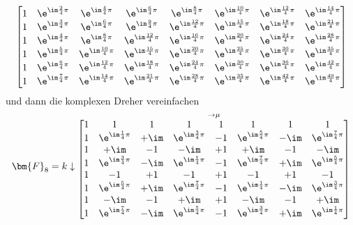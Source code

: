 \begin{Ansatz}
\begin{align}
\begin{bmatrix}
1 & \e^{\im\frac{2}{4}\pi} & \e^{\im\frac{4}{4}\pi} & \e^{\im\frac{6}{4}\pi} & \e^{\im\frac{8}{4}\pi} & \e^{\im\frac{10}{4}\pi} & \e^{\im\frac{12}{4}\pi} & \e^{\im\frac{14}{4}\pi}\\
1 & \e^{\im\frac{3}{4}\pi} & \e^{\im\frac{6}{4}\pi} & \e^{\im\frac{9}{4}\pi} & \e^{\im\frac{12}{4}\pi} & \e^{\im\frac{15}{4}\pi} & \e^{\im\frac{18}{4}\pi} & \e^{\im\frac{21}{4}\pi}\\
1 & \e^{\im\frac{4}{4}\pi} & \e^{\im\frac{8}{4}\pi} & \e^{\im\frac{12}{4}\pi} & \e^{\im\frac{16}{4}\pi} & \e^{\im\frac{20}{4}\pi} & \e^{\im\frac{24}{4}\pi} & \e^{\im\frac{28}{4}\pi}\\
1 & \e^{\im\frac{5}{4}\pi} & \e^{\im\frac{10}{4}\pi} & \e^{\im\frac{15}{4}\pi} & \e^{\im\frac{20}{4}\pi} & \e^{\im\frac{25}{4}\pi} & \e^{\im\frac{30}{4}\pi} & \e^{\im\frac{35}{4}\pi}\\
1 & \e^{\im\frac{6}{4}\pi} & \e^{\im\frac{12}{4}\pi} & \e^{\im\frac{18}{4}\pi} & \e^{\im\frac{24}{4}\pi} & \e^{\im\frac{30}{4}\pi} & \e^{\im\frac{36}{4}\pi} & \e^{\im\frac{42}{4}\pi}\\
1 & \e^{\im\frac{7}{4}\pi} & \e^{\im\frac{14}{4}\pi} & \e^{\im\frac{21}{4}\pi} & \e^{\im\frac{28}{4}\pi} & \e^{\im\frac{35}{4}\pi} & \e^{\im\frac{42}{4}\pi} & \e^{\im\frac{49}{4}\pi}\\
\end{bmatrix}
\end{align}
und dann die komplexen Dreher vereinfachen
\begin{align}
\bm{F}_8 =
k \downarrow
\substack{\rightarrow \mu\\
\begin{bmatrix}
1 & 1 & 1 & 1 & 1 & 1 & 1 & 1\\
1 & \e^{\im\frac{1}{4}\pi} & +\im & \e^{\im\frac{3}{4}\pi} & -1 & \e^{\im\frac{5}{4}\pi} & -\im & \e^{\im\frac{7}{4}\pi}\\
1 & +\im & -1 & -\im & +1 & +\im & -1 & -\im\\
1 & \e^{\im\frac{3}{4}\pi} & -\im & \e^{\im\frac{1}{4}\pi} & -1 & \e^{\im\frac{7}{4}\pi} & +\im & \e^{\im\frac{5}{4}\pi}\\
1 & -1 & +1 & -1 & +1 & -1 & +1 & -1\\
1 & \e^{\im\frac{5}{4}\pi} & +\im & \e^{\im\frac{7}{4}\pi} & -1 & \e^{\im\frac{1}{4}\pi} & -\im & \e^{\im\frac{3}{4}\pi}\\
1 & -\im & -1 & +\im & +1 & -\im & -1 & +\im\\
1 & \e^{\im\frac{7}{4}\pi} & -\im & \e^{\im\frac{5}{4}\pi} & -1 & \e^{\im\frac{3}{4}\pi} & +\im & \e^{\im\frac{1}{4}\pi}\\

\end{bmatrix}}
\end{align}
\end{Ansatz}
